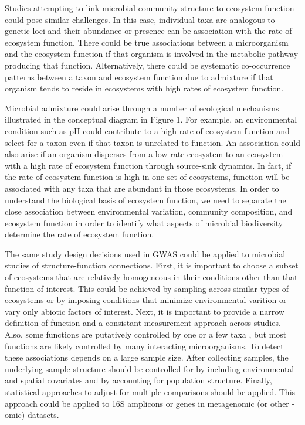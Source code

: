 \documentclass{article}
\begin{document}
Studies attempting to link microbial community structure to ecosystem function
could pose similar challenges. In this case, individual taxa are analogous to
genetic loci and their abundance or presence can be association with the rate of 
ecosystem function. There
could be true associations between a microorganism and the ecosystem function if
that organism is involved in the metabolic pathway producing that function.
Alternatively, there 
could be systematic co-occurrence patterns between a taxon and ecosystem
function due to admixture if that organism tends to reside in ecosystems with
high rates of ecosystem function.

Microbial admixture could arise through a
number of ecological mechanisms illustrated in the conceptual diagram in Figure 1. For
example, an environmental condition such as pH could contribute to a high rate
of ecosystem function and select for a taxon even if that taxon is unrelated to
function. An association could also arise if an organism disperses from a
low-rate ecosystem to an ecosystem with a high rate of ecosystem function
through source-sink dynamics. In fact, if the rate of
ecosystem function is high in one set of ecosystems, function will be
associated with any taxa that are abundant in those ecosystems.
In order to understand the biological basis of ecosystem function, we need to
separate the close association between environmental variation, community
composition, and ecosystem function in order to identify what aspects of
microbial biodiversity determine the rate of ecosystem function.


The same study design decisions used in GWAS could be applied to microbial
studies of structure-function connections. First, it is important to choose a 
subset of ecosystems that are relatively homogeneous in their conditions other
than that function of interest. This could be achieved by sampling across
similar types of ecosystems or by imposing conditions that minimize
environmental varition or vary only abiotic factors of interest. Next, it is important to provide a narrow
definition of function and a consistant measurement approach across studies.
Also, some functions are putatively controlled by one or a few taxa
\citep{mccalley2014}, but most functions are likely controlled by many
interacting microorganisms. To detect these associations depends on a large
sample size. After collecting samples, the underlying sample structure should be
controlled for by including environmental and spatial covariates and by
accounting for population structure. Finally, statistical approaches to adjust
for multiple comparisons should be applied. This approach could be applied to 16S amplicons or
genes in metagenomic (or other -omic) datasets. 
\end{document}
